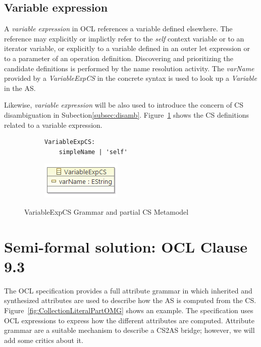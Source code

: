\documentclass{llncs}
\begin{document}
\subsection{Variable expression}

A \textit{variable expression} in OCL references a variable defined elsewhere. The reference may explicitly or implictly refer to the \emph{self} context variable or to an iterator variable, or explicitly to a variable defined in an outer let expression or to a parameter of an operation definition. Discovering and prioritizing the candidate definitions is performed by the name resolution activity. The \emph{varName} provided by a \emph{VariableExpCS} in the concrete syntax is used to look up a \emph{Variable} in the AS. 

Likewise, \textit{variable expression} will be also used to introduce the concern of CS disambiguation in Subection\ref{subsec:disamb}.  Figure~\ref{fig:VariableExpCS} shows the CS definitions related to a variable expression. 

\begin{figure}[htbp]
\centering
\begin{subfigure}{0.5\textwidth}
  \centering
 \begin{lstlisting}[label=lst:VariableExpEBNF, language=Xtext]
 VariableExpCS:
 	simpleName | 'self'
 \end{lstlisting} 
\end{subfigure}%
\begin{subfigure}{0.5\textwidth}
  \centering
  \includegraphics[scale=0.75]{images/VariableExpCS.png}
\end{subfigure}
\caption{VariableExpCS Grammar and partial CS Metamodel}
\label{fig:VariableExpCS}
\end{figure}



\section{Semi-formal solution: OCL Clause 9.3}
\label{sec:semi-formal-solution}

The OCL specification provides a full attribute grammar in which inherited and synthesized attributes are used to describe how the AS is computed from the CS. Figure~\ref{fig:CollectionLiteralPartOMG} shows an example. The specification uses OCL expressions to express how the different attributes are computed. Attribute grammar are a suitable mechanism to describe a CS2AS bridge; however, we will add some critics about it. 
\end{document}
